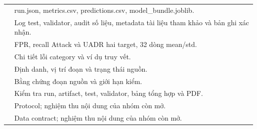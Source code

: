 \documentclass[12pt,a4paper,oneside]{report}
\begin{document}
\begin{longtable}{L{9.0cm}L{6.3cm}}
 & run.json, metrics.csv, predictions.csv, model\_bundle.joblib.\\
 & Log test, validator, audit số liệu, metadata tài liệu tham khảo và bản ghi xác nhận.\\
 & FPR, recall Attack và UADR hai target, 32 dòng mean/std.\\
 & Chi tiết lỗi category và ví dụ truy vết.\\
 & Định danh, vị trí đoạn và trạng thái nguồn.\\
 & Bằng chứng đoạn nguồn và giới hạn kiểm.\\
 & Kiểm tra run, artifact, test, validator, bảng tổng hợp và PDF.\\
 & Protocol; nghiệm thu nội dung của nhóm còn mở.\\
 & Data contract; nghiệm thu nội dung của nhóm còn mở.\\
\bottomrule\end{longtable}\endgroup
\end{document}
